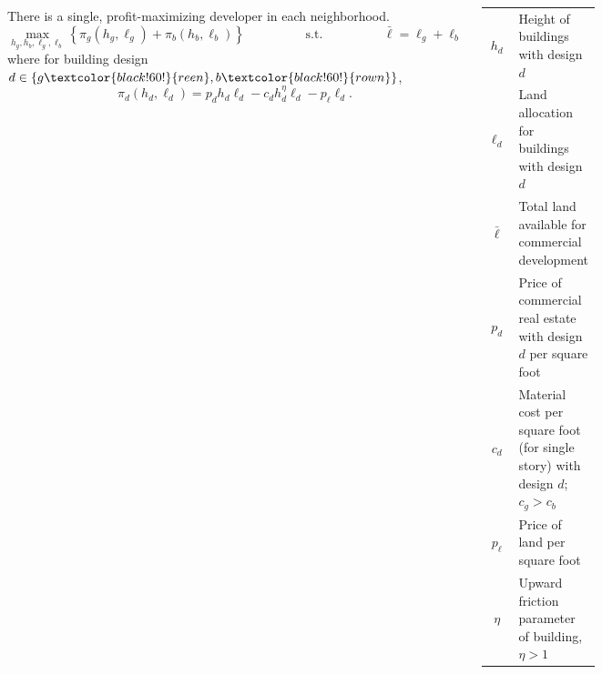 \documentclass[20pt,margin=2in,innermargin=-12in,blockverticalspace= 2cm]{tikzposter}
\begin{document}
\begin{columns}
{%

There is a single, profit-maximizing developer in each neighborhood.
$$\max_{h_g, h_b,\ell_g, \ell_b} \left\{ \pi_g(h_g, \ell_g) + \pi_b(h_b, \ell_b)\right\} \hspace{2cm}\mathrm{s.t.}\hspace{2cm} \bar{\ell} = \ell_g + \ell_b$$
where for building design $d\in \{g\textcolor{black!60!}{reen}, b\textcolor{black!60!}{rown}\}$,
$$\pi_d(h_d, \ell_d) = p_d h_d \ell_d - c_d h_d^\eta \ell_d - p_\ell \ell_d.$$
\begin{center}
\begin{tabular}{c p{17cm}}
	$h_d$ & Height of buildings with design $d$\\
	$\ell_d$ & Land allocation for buildings with design $d$\\
	$\bar{\ell}$ & Total land available for commercial development\\
	$p_d$ & Price of commercial real estate with design $d$ per square foot\\
	$c_d$ & Material cost per square foot (for single story) with design $d$; $c_g > c_b$\\
	$p_\ell$ & Price of land per square foot\\
	$\eta$ & Upward friction parameter of building, $\eta > 1$\\
\end{tabular}
\end{center}

}


\end{columns}
\end{document}
